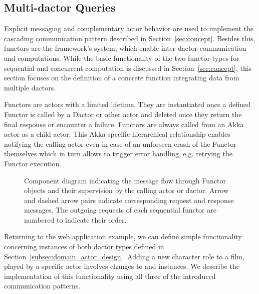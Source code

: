 \subsection[Multi-Dactor Queries]{Multi-\Gls{dactor} Queries}\label{subsec:multi_dactor_queries}

Explicit messaging and complementary actor behavior are used to implement the cascading communication pattern described in Section~\ref{sec:concept}.
Besides this, \glspl{functor} are the framework's system, which enable inter-\gls{dactor} communication and computations.
While the basic functionality of the two \gls{functor} types for sequential and concurrent computation is discussed in Section~\ref{sec:concept}, this section focuses on the definition of a concrete function integrating data from multiple \glspl{dactor}.

Functors are actors with a limited lifetime.
They are instantiated once a defined Functor is called by a Dactor or other actor and deleted once they return the final response or encounter a failure.
Functors are always called from an Akka actor as a child actor.
This Akka-specific hierarchical relationship enables notifying the calling actor even in case of an unforseen crash of the Functor themselves which in turn allows to trigger error handling, e.g. retrying the Functor execution.

\begin{figure}[t]
  \centering
  
  \caption{Component diagram indicating the message flow through Functor objects and their supervision by the calling actor or \gls{dactor}. Arrow and dashed arrow pairs indicate corresponding request and response messages. The outgoing requests of each sequential functor are numbered to indicate their order.}
  \label{fig:functor_diagram}
\end{figure}

Returning to the web application example, we can define simple functionality concerning instances of both \gls{dactor} types defined in Section~\ref{subsec:domain_actor_design}.
Adding a new character role to a film, played by a specific actor involves changes to  and  instances.
We describe the implementation of this functionality using all three of the introduced communication patterns.


